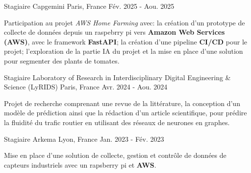 

\begin{cventries}

    \cventry
    {Stagiaire} %
    {Capgemini} %
    {Paris, France} %
    {Fév. 2025 - Aou. 2025} %
    {
        \begin{cvitems} %
            Participation au projet \textit{AWS Home Farming} avec:
            la création d'un prototype de collecte de données depuis un raspebrry pi vers
            \textbf{Amazon Web Services (AWS)}, avec le framework \textbf{FastAPI};
            la création d'une pipeline \textbf{CI/CD} pour le projet;
            l'exploration de la partie IA du projet et la mise en place d'une solution pour segmenter des plants de
            tomates.
        \end{cvitems}
    }

    \cventry
    {Stagiaire} %
    {Laboratory of Research in Interdisciplinary Digital Engineering \& Science (LyRIDS)} %
    {Paris, France} %
    {Avr. 2024 - Aou. 2024} %
    {
        \begin{cvitems} %
            Projet de recherche comprenant une revue de la littérature, la conception d’un modèle de prédiction ainsi
            que la rédaction d’un article scientifique, pour prédire la fluidité du trafic routier en utilisant des
            réseaux de neurones en graphes.
        \end{cvitems}
    }

    \cventry
    {Stagiaire} %
    {Arkema} %
    {Lyon, France} %
    {Jan. 2023 - Fév. 2023} %
    {
        \begin{cvitems} %
            Mise en place d’une solution de collecte, gestion et contrôle de données de capteurs industriels avec un
            rapsberry pi et \textbf{AWS}.
        \end{cvitems}
    }

\end{cventries}

